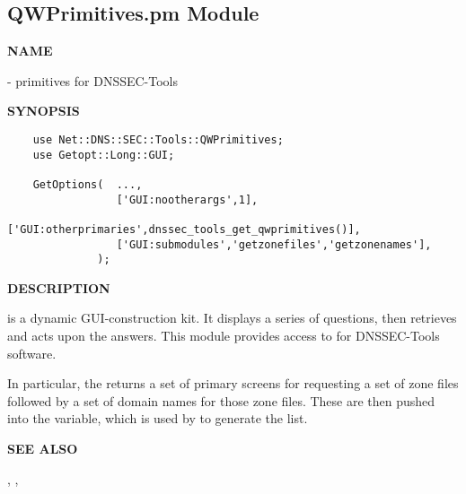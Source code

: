 \clearpage

\subsection{\bf QWPrimitives.pm Module}

{\bf NAME}

 -  primitives
for DNSSEC-Tools

{\bf SYNOPSIS}

\begin{verbatim}
    use Net::DNS::SEC::Tools::QWPrimitives;
    use Getopt::Long::GUI;

    GetOptions(  ...,
                 ['GUI:nootherargs',1],
                 ['GUI:otherprimaries',dnssec_tools_get_qwprimitives()],
                 ['GUI:submodules','getzonefiles','getzonenames'],
              );
\end{verbatim}

{\bf DESCRIPTION}

 is a dynamic GUI-construction kit.  It displays a series of
questions, then retrieves and acts upon the answers.  This module provides
access to  for DNSSEC-Tools software.

In particular, the  returns a set of
primary screens for requesting a set of zone files followed by a set of domain
names for those zone files.  These are then pushed into the 
 variable, which is used by  to
generate the \var{\@ARGV} list.

{\bf SEE ALSO}

,
,
